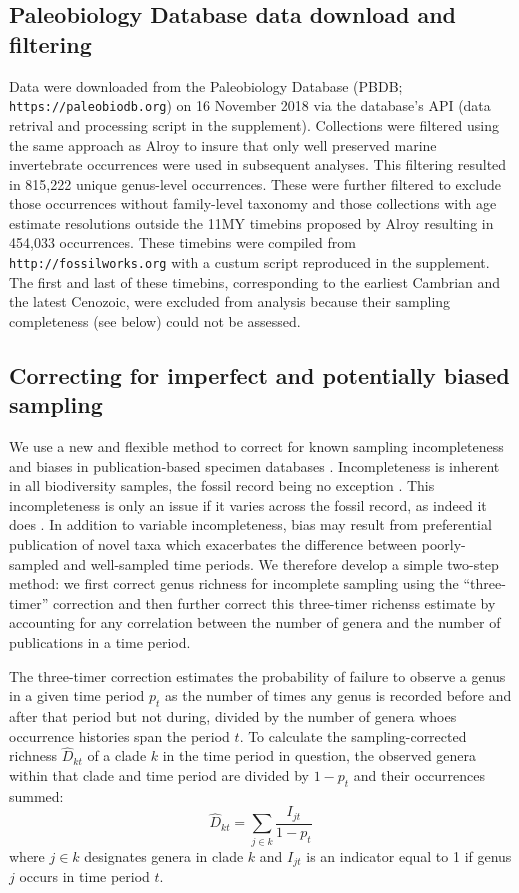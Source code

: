 \documentclass[12pt]{article}
\let\citep=\cite
\begin{document}
\subsection{Paleobiology Database data download and filtering}
Data were downloaded from the Paleobiology Database (PBDB; {\tt
  https://paleobiodb.org}) on 16 November 2018 via the database's API
(data retrival and processing script in the supplement). Collections
were filtered using the same approach as Alroy \citep{alroy08} to
insure that only well preserved marine invertebrate occurrences were
used in subsequent analyses. This filtering resulted in 815,222 unique
genus-level occurrences. These were further filtered to exclude those
occurrences without family-level taxonomy and those collections with
age estimate resolutions outside the 11MY timebins proposed by Alroy
\citep{alroy08} resulting in 454,033 occurrences. These timebins were
compiled from {\tt http://fossilworks.org} with a custum script
reproduced in the supplement. The first and last of these timebins,
corresponding to the earliest Cambrian and the latest Cenozoic, were
excluded from analysis because their sampling completeness (see below)
could not be assessed.


\subsection{Correcting for imperfect and potentially biased sampling}
\label{sec:3TP}
We use a new and flexible method to correct for known sampling
incompleteness and biases in publication-based specimen databases
\citep{alroy08, alroy2010}. Incompleteness is inherent in all
biodiversity samples, the fossil record being no exception
\citep{miller1996, foote2016, starrfelt2016, close2018}. This
incompleteness is only an issue if it varies across the fossil record,
as indeed it does \citep{miller1996 , foote2016, starrfelt2016,
  close2018}.  In addition to variable incompleteness, bias may result
from preferential publication of novel taxa \citep{alroy2010} which
exacerbates the difference between poorly-sampled and well-sampled
time periods. We therefore develop a simple two-step method: we first
correct genus richness for incomplete sampling using the
``three-timer'' correction \citep{alroy08} and then further correct
this three-timer richenss estimate by accounting for any correlation
between the number of genera and the number of publications in a time
period.

The three-timer correction estimates the probability of failure to
observe a genus in a given time period $p_t$ as the number of times
any genus is recorded before and after that period but not during,
divided by the number of genera whoes occurrence histories span the
period $t$.  To calculate the sampling-corrected richness
$\hat{D}_{kt}$ of a clade $k$ in the time period in question, the
observed genera within that clade and time period are divided by
$1 - p_t$ and their occurrences summed:
\begin{equation}
  \hat{D}_{kt} = \sum_{j \in k} \frac{I_{jt}}{1 - p_t}
\end{equation}
where $j \in k$ designates genera in clade $k$ and $I_{jt}$ is an
indicator equal to 1 if genus $j$ occurs in time period $t$.
\end{document}
